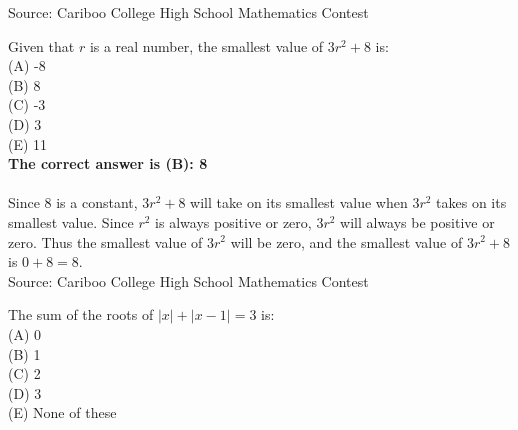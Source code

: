 \documentclass{article}
\begin{document}
\scriptsize
Source: Cariboo College High School Mathematics Contest

\normalsize
Given that $r$ is a real number, the smallest value of $3r^{2}+8$ is:\\
(A) -8\\
(B) 8\\
(C) -3\\
(D) 3\\
(E) 11\\


\textbf{The correct answer is (B): 8\\}\\[1 ex]
Since 8 is a constant, $3r^{2}+8$ will take on its smallest value when $3r^{2}$ takes on its smallest value.  Since $r^2$ is always positive or zero, $3r^2$ will always be positive or zero. Thus the smallest value of $3r^2$ will be zero, and the smallest value of $3r^{2}+8$ is $0+8=8$.
\\[5 ex]

\scriptsize
Source: Cariboo College High School Mathematics Contest

\normalsize
The sum of the roots of $|x|+|x-1|=3$ is:\\
(A) 0\\
(B) 1\\
(C) 2\\
(D) 3\\
(E) None of these\\

\end{document}
